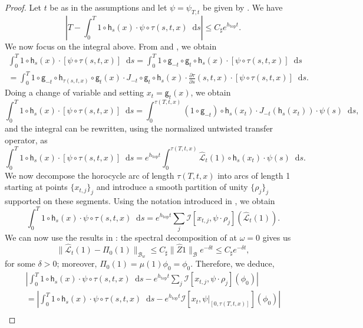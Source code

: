 \documentclass[11pt,letterpaper]{amsart}
\newcommand \cL {{\mathcal L}}
\newcommand \cB {{\mathscr B}}
\newcommand \sC {{C_\sharp}}
\newcommand{\horo}{\mathsf{h}}
\newcommand{\geo}{\mathsf{g}}
\newcommand*{\diff}{\mathop{}\!\mathrm{d}}
\DeclareMathOperator{\topp}{top}
\theoremstyle{definition}
\begin{document}
\begin{proof}
Let $t$ be as in the assumptions and let $\psi = \psi_{T,t}$ be given by . We have
\[
\left\lvert T - \int_{0}^{T} 1 \circ \horo_s(x) \cdot \psi\circ \tau(s,t,x) \diff s\right\rvert \leq \sC e^{h_{\topp}t} .
\]
We now focus on the integral above.
From  and  , we obtain
\begin{multline*}
\int_0^T 1 \circ \horo_s(x) \cdot [\psi \circ \tau(s,t,x) ] \diff s = \int_0^T 1 \circ \geo_{-t}  \circ \geo_{t} \circ \horo_s(x)\cdot [\psi \circ \tau(s,t,x) ] \diff s \\
 = \int_0^T 1 \circ \geo_{-t} \circ \horo_{\tau(s,t,x)} \circ \geo_{t}(x) \cdot J_{-t} \circ \geo_{t} \circ \horo_s(x) \cdot \frac{\partial \tau}{\partial s}(s,t,x) \cdot [\psi \circ \tau(s,t,x) ] \diff s.
\end{multline*}
Doing a change of variable and setting $x_{t} = \geo_{t}(x)$, we obtain
\[
\int_0^T 1 \circ \horo_s(x) \cdot [\psi \circ \tau(s,t,x) ] \diff s = \int_{0}^{\tau(T,t,x)} (1 \circ \geo_{-t})\circ \horo_s(x_{t}) \cdot J_{-t} (\horo_s (x_{t})) \cdot \psi(s)\diff s,
\]
and the integral can be rewritten, using the normalized untwisted transfer operator, as
\[
\int_{0}^{T} 1 \circ \horo_s(x) \cdot [\psi \circ \tau(s,t,x) ] \diff s = e^{h_{\topp}t} \int_{0}^{\tau(T,t,x)} \hat{ \cL}_{t} (1) \circ \horo_s(x_{t}) \cdot \psi(s) \diff s.
\]
We now decompose the horocycle arc of length $\tau(T,t,x)$ into arcs of length 1 starting at points $\{x_{t,j}\}_j$ and introduce a smooth partition of unity $\{\rho_j\}_j$ supported on these segments. 
Using the notation introduced in , we obtain
\[
\int_{0}^{T} 1 \circ \horo_s(x) \cdot \psi \circ \tau(s,t,x) \diff s = e^{h_{\topp}t} \sum_j \mathcal{I}[x_{t,j},\psi \cdot \rho_j](\hat{ \cL}_{t} (1)). 
\]
We can now use the results in :
the spectral decomposition of  at $\omega = 0$ gives us
\[
\| \hat{ \cL}_{t} (1) - \Pi_0(1)\|_{\cB_w} \leq \sC \|\hat{Z}1 \|_{\cB}e^{-\delta t} \leq \sC e^{-\delta t},
\]
for some $\delta >0$; moreover, 
$\Pi_0(1) = \mu(1)\phi_0=\phi_0$. 
Therefore, we deduce,
\begin{multline*}
\left\lvert \int_{0}^{T} 1 \circ \horo_s(x) \cdot \psi \circ \tau(s,t,x) \diff s - e^{h_{\topp}t} \sum_j \mathcal{I}[x_{t,j},\psi \cdot \rho_j](\phi_0)\right\rvert \\
=\left\lvert \int_{0}^{T} 1 \circ \horo_s(x) \cdot \psi \circ \tau(s,t,x) \diff s - e^{h_{\topp}t}  \mathcal{I}[x_{t},\psi|_{[0,\tau(T,t,x)]}](\phi_0)  \right\rvert \\

\end{multline*}
\end{proof}
\end{document}
